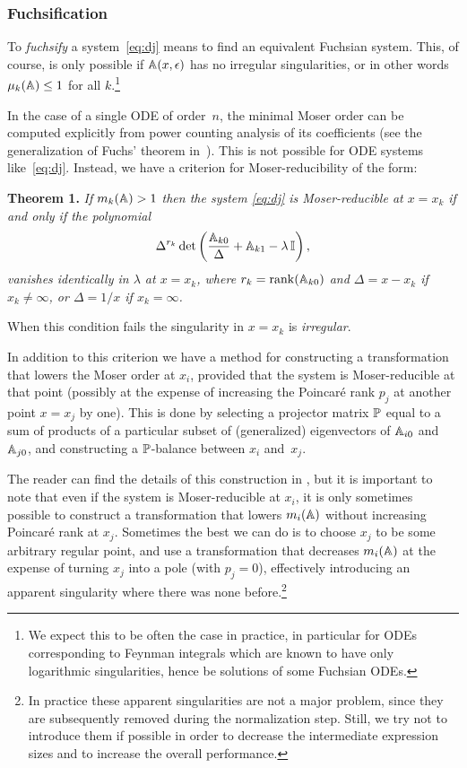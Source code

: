 \documentclass[12pt,a4paper]{article}
\begin{document}
\subsubsection{Fuchsification}
\label{sec:fuchs}

To \textit{fuchsify} a system~\eqref{eq:dj} means to find an equivalent Fuchsian system.
This, of course, is only possible if $\mathbb{A}(x,\epsilon)$ has no irregular singularities, or in other words $\mu_k(\mathbb{A})\le1$ for all $k$.\footnote{
    We expect this to be often the case in practice, in particular for ODEs corresponding to Feynman integrals which are known to have only logarithmic singularities, hence be solutions of some Fuchsian ODEs.
}

In the case of a single ODE of order~$n$, the minimal Moser order can be computed explicitly from power counting analysis of its coefficients (see the generalization of Fuchs' theorem in~\cite{Mos59}).
This is not possible for ODE systems like~\eqref{eq:dj}.
Instead, we have a criterion for Moser-reducibility of the form:

\textbf{Theorem 1.}
{\em If $m_k(\mathbb{A}) > 1$ then the system \eqref{eq:dj} is Moser-reducible at $x=x_k$ if and only if the polynomial}
\begin{equation}
\label{eq:red_cond}
    \Delta^{r_k} \det\left(\frac{\mathbb{A}_{k0}}{\Delta} + \mathbb{A}_{k1} - \lambda \,\mathbb{I}\right),
\end{equation}
{\em vanishes identically in $\lambda$ at $x=x_k$, where $r_k=\mathrm{rank}(\mathbb{A}_{k0})$ and $\Delta=x-x_k$ if $x_k\ne\infty$, or $\Delta=1/x$ if $x_k=\infty$.}

When this condition fails the singularity in $x=x_k$ is {\em irregular}.

In addition to this criterion we have a method for constructing a transformation that lowers the Moser order at $x_i$, provided that the system is Moser-reducible at that point (possibly at the expense of increasing the Poincar\'e rank $p_j$ at another point $x=x_j$ by one).
This is done by selecting a projector matrix $\mathbb{P}$ equal to a sum of products of a particular subset of (generalized) eigenvectors of $\mathbb{A}_{i0}$ and $\mathbb{A}_{j0}$, and constructing a $\mathbb{P}$-balance between $x_i$ and~$x_j$.

The reader can find the details of this construction in \cite{Lee15}, but it is important to note that even if the system is Moser-reducible at $x_i$, it is only sometimes possible to construct a transformation that lowers $m_i(\mathbb{A})$ without increasing Poincar\'e rank at $x_j$.
Sometimes the best we can do is to choose $x_j$ to be some arbitrary regular point, and use a transformation that decreases $m_i(\mathbb{A})$ at the expense of turning $x_j$ into a pole (with $p_j=0$), effectively introducing an apparent singularity where there was none before.\footnote{
    In practice these apparent singularities are not a major problem, since they are subsequently removed during the normalization step.
    Still, we try not to introduce them if possible in order to decrease the intermediate expression sizes and to increase the overall performance.
}
\end{document}
